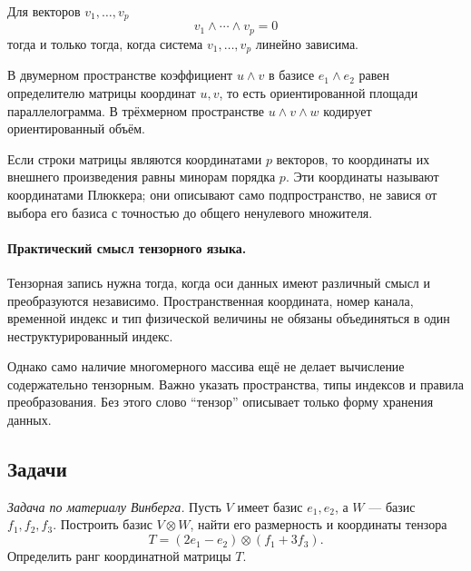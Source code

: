 \begin{theorem}
Для векторов \(v_1,\dots,v_p\)
\[
v_1\wedge\cdots\wedge v_p=0
\]
тогда и только тогда, когда система \(v_1,\dots,v_p\) линейно зависима.
\end{theorem}

В двумерном пространстве коэффициент \(u\wedge v\) в базисе \(e_1\wedge e_2\) равен определителю матрицы координат \(u,v\), то есть ориентированной площади параллелограмма. В трёхмерном пространстве \(u\wedge v\wedge w\) кодирует ориентированный объём.

Если строки матрицы являются координатами \(p\) векторов, то координаты их внешнего произведения равны минорам порядка \(p\). Эти координаты называют координатами Плюккера; они описывают само подпространство, не завися от выбора его базиса с точностью до общего ненулевого множителя.

\paragraph{Практический смысл тензорного языка.}

Тензорная запись нужна тогда, когда оси данных имеют различный смысл и преобразуются независимо. Пространственная координата, номер канала, временной индекс и тип физической величины не обязаны объединяться в один неструктурированный индекс.

Однако само наличие многомерного массива ещё не делает вычисление содержательно тензорным. Важно указать пространства, типы индексов и правила преобразования. Без этого слово ``тензор'' описывает только форму хранения данных.

\subsection*{Задачи}

\begin{problem}
\textit{Задача по материалу Винберга.}
Пусть \(V\) имеет базис \(e_1,e_2\), а \(W\) --- базис \(f_1,f_2,f_3\). Построить базис \(V\otimes W\), найти его размерность и координаты тензора
\[
T=(2e_1-e_2)\otimes(f_1+3f_3).
\]
Определить ранг координатной матрицы \(T\).
\end{problem}


